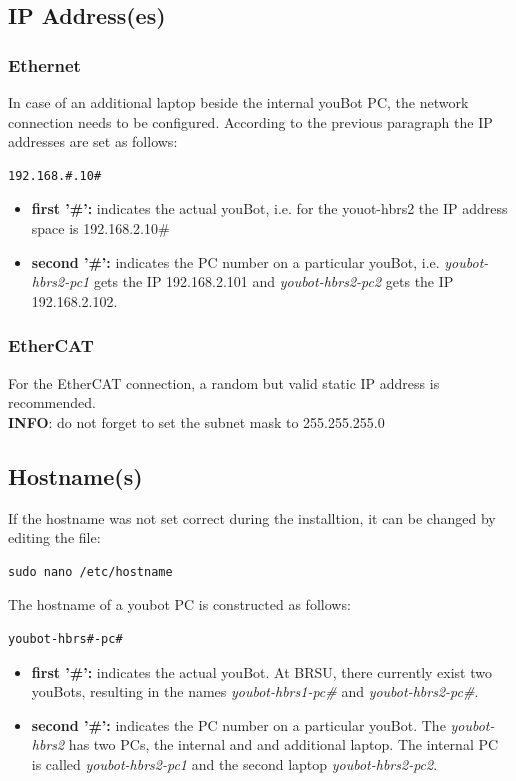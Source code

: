 \documentclass[a4paper,12pt]{article}
\begin{document}
\subsection{IP Address(es)}

\subsubsection{Ethernet}
In case of an additional laptop beside the internal youBot PC, the network connection needs to be configured. According to the previous paragraph the IP addresses are set as follows:
\begin{lstlisting}
192.168.#.10#
\end{lstlisting}

\begin{itemize}
	\item \textbf{first '\#':} indicates the actual youBot, i.e. for the youot-hbrs2 the IP address space is 192.168.2.10\#
	\item \textbf{second '\#':} indicates the PC number on a particular youBot, i.e. \textit{youbot-hbrs2-pc1} gets the IP 192.168.2.101 and \textit{youbot-hbrs2-pc2} gets the IP 192.168.2.102.
\end{itemize}

\subsubsection{EtherCAT}
For the EtherCAT connection, a random but valid static IP address is recommended.\\

\textbf{INFO}: do not forget to set the subnet mask to 255.255.255.0

\subsection{Hostname(s)}
If the hostname was not set correct during the installtion, it can be changed by editing the file:
\begin{lstlisting}
sudo nano /etc/hostname
\end{lstlisting}

The hostname of a youbot PC is constructed as follows:
\begin{lstlisting}
youbot-hbrs#-pc#
\end{lstlisting}

\begin{itemize}
	\item \textbf{first '\#':} indicates the actual youBot. At BRSU, there currently exist two youBots, resulting in the names \textit{youbot-hbrs1-pc\#} and \textit{youbot-hbrs2-pc\#}.
	\item \textbf{second '\#':} indicates the PC number on a particular youBot. The \textit{youbot-hbrs2} has two PCs, the internal and and additional laptop. The internal PC is called \textit{youbot-hbrs2-pc1} and the second laptop \textit{youbot-hbrs2-pc2}.
\end{itemize}
\end{document}
